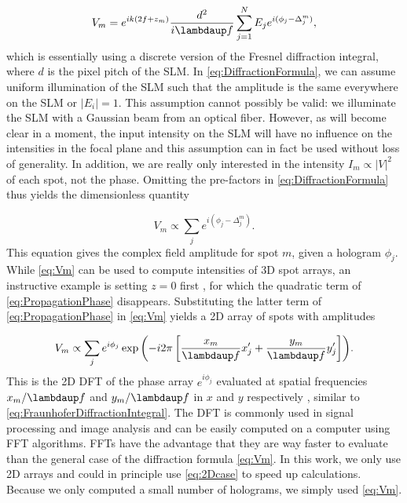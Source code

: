 \begin{equation}\label{eq:DiffractionFormula}
    V_m = e^{i k \left(2 f + z_m\right)}
    \frac{d^2}{i \lambdaup f} \sum_{j=1}^N E_j e^{i(\phi_j - \Delta_j^m)},
\end{equation}
which is essentially using a discrete version of the Fresnel diffraction integral, where $d$ is the pixel pitch of the SLM. 
In \cref{eq:DiffractionFormula}, we can assume uniform illumination of the SLM such that the amplitude is the same everywhere on the SLM or $|E_i| = 1$.
This assumption cannot possibly be valid: we illuminate the SLM with a Gaussian beam from an optical fiber.
However, as will become clear in a moment, the input intensity on the SLM will have no influence on the intensities in the focal plane and this assumption can in fact be used without loss of generality.
In addition, we are really only interested in the intensity $I_m \propto |V|^2$ of each spot, not the phase.
Omitting the pre-factors in \cref{eq:DiffractionFormula} thus yields the dimensionless quantity \cite{DiLeonardo2007}

\begin{equation}\label{eq:Vm}
    V_m \propto \sum_{j} e^{i(\phi_j - \Delta_j^m)}.
\end{equation}
This equation gives the complex field amplitude for spot $m$, given a hologram $\phi_j$.
While \cref{eq:Vm} can be used to compute intensities of 3D spot arrays, an instructive example is setting $z=0$ first \cite{DiLeonardo2007}, for which the quadratic term of \cref{eq:PropagationPhase} disappears.
Substituting the latter term of \cref{eq:PropagationPhase} in \cref{eq:Vm} yields a 2D array of spots with amplitudes 

\begin{equation}\label{eq:2Dcase}
    V_m \propto \sum_j e^{i\phi_j} \exp{\left(
    - i 2\pi \left[
    \frac{x_m}{\lambdaup f} x'_j + \frac{y_m}{\lambdaup f} y'_j
    \right]
    \right)}.
\end{equation}
This is the 2D \ac{DFT} of the phase array $e^{i\phi_j}$ evaluated at spatial frequencies $x_m/\lambdaup f$ and $y_m/\lambdaup f$ in $x$ and $y$ respectively \cite{Bijnen2015,DiLeonardo2007}, similar to \cref{eq:FraunhoferDiffractionIntegral}.
The DFT is commonly used in signal processing and image analysis and can be easily computed on a computer using \ac{FFT} algorithms. 
FFTs have the advantage that they are way faster to evaluate than the general case of the diffraction formula \cref{eq:Vm}.
In this work, we only use 2D arrays and could in principle use \cref{eq:2Dcase} to speed up calculations.
Because we only computed a small number of holograms, we simply used \cref{eq:Vm}.

